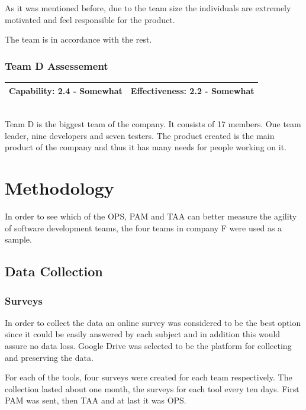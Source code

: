 As it was mentioned before, due to the team size the individuals are extremely motivated and feel responsible for the product.

The team is in accordance with the rest.


\subsubsection{Team D Assessement}
\begin{tabular}{| p{6cm} | p{6cm}|}
\hline
\textbf{Capability:} 2.4 - Somewhat & \textbf{Effectiveness:} 2.2 - Somewhat \\ \hline
\end{tabular} \\

Team D is the biggest team of the company. It consists of 17 members. One team leader, nine developers and seven testers. The product created is the main product of the company and thus it has many needs for people working on it. 



\section{Methodology}
In order to see which of the OPS, PAM and TAA can better measure the agility of software development teams, the four teams in company F were used as a sample.

\subsection{Data Collection}


\subsubsection{Surveys}
In order to collect the data an online survey was considered to be the best option since it could be easily answered by each subject and in addition this would assure no data loss. Google Drive \texttrademark \cite{google_drive} was selected to be the platform for collecting and preserving the data.

For each of the tools, four surveys were created for each team respectively. The collection lasted about one month, the surveys for each tool every ten days. First PAM was sent, then TAA and at last it was OPS.

